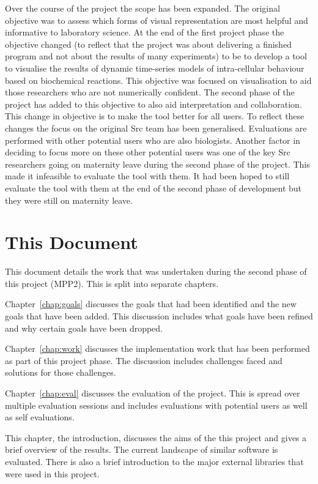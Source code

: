 Over the course of the project the scope has been expanded.  The original objective was to assess which forms of visual representation are most helpful and informative to laboratory science.  At the end of the first project phase the objective changed (to reflect that the project was about delivering a finished program and not about the results of many experiments) to be to develop a tool to visualise the results of dynamic time-series models of intra-cellular behaviour based on biochemical reactions.  This objective was focused on visualisation to aid those researchers who are not numerically confident.  The second phase of the project has added to this objective to also aid interpretation and collaboration.  This change in objective is to make the tool better for all users.  To reflect these changes the focus on the original Src team has been generalised.  Evaluations are performed with other potential users who are also biologists.  Another factor in deciding to focus more on these other potential users was one of the key Src researchers going on maternity leave during the second phase of the project.  This made it infeasible to evaluate the tool with them.  It had been hoped to still evaluate the tool with them at the end of the second phase of development but they were still on maternity leave.

\section{This Document}

This document details the work that was undertaken during the second phase of this project (MPP2).  This is split into separate chapters.

Chapter~\ref{chap:goals} discusses the goals that had been identified and the new goals that have been added.  This discussion includes what goals have been refined and why certain goals have been dropped.

Chapter~\ref{chap:work} discusses the implementation work that has been performed as part of this project phase.  The discussion includes challenges faced and solutions for those challenges.

Chapter~\ref{chap:eval} discusses the evaluation of the project.  This is spread over multiple evaluation sessions and includes evaluations with potential users as well as self evaluations.

This chapter, the introduction, discusses the aims of the this project and gives a brief overview of the results.  The current landscape of similar software is evaluated.  There is also a brief introduction to the major external libraries that were used in this project.


